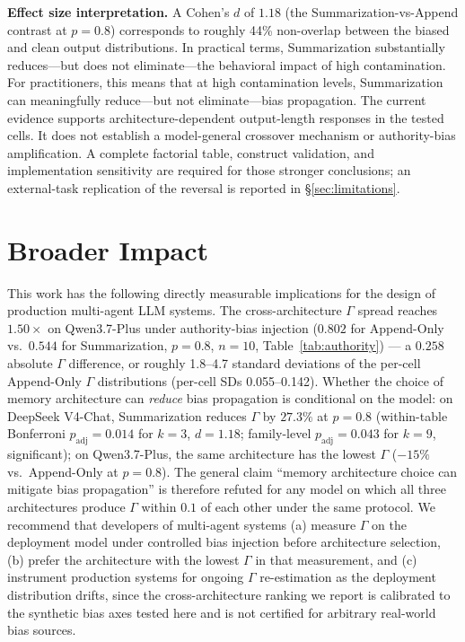 \documentclass[11pt]{article}
\begin{document}
\textbf{Effect size interpretation.} A Cohen's $d$ of $1.18$ (the Summarization-vs-Append contrast at $p{=}0.8$) corresponds to roughly 44\% non-overlap between the biased and clean output distributions. In practical terms, Summarization substantially reduces---but does not eliminate---the behavioral impact of high contamination. For practitioners, this means that at high contamination levels, Summarization can meaningfully reduce---but not eliminate---bias propagation.
The current evidence supports architecture-dependent output-length responses in the tested cells. It does not establish a model-general crossover mechanism or authority-bias amplification. A complete factorial table, construct validation, and implementation sensitivity are required for those stronger conclusions; an external-task replication of the reversal is reported in \S\ref{sec:limitations}.


\section{Broader Impact}

This work has the following directly measurable implications for the design of production multi-agent LLM systems. The cross-architecture $\Gamma$ spread reaches $1.50\times$ on Qwen3.7-Plus under authority-bias injection ($0.802$ for Append-Only vs.\ $0.544$ for Summarization, $p=0.8$, $n{=}10$, Table~\ref{tab:authority}) --- a $0.258$ absolute $\Gamma$ difference, or roughly 1.8--4.7 standard deviations of the per-cell Append-Only $\Gamma$ distributions (per-cell SDs 0.055--0.142). Whether the choice of memory architecture can \emph{reduce} bias propagation is conditional on the model: on DeepSeek V4-Chat, Summarization reduces $\Gamma$ by $27.3\%$ at $p=0.8$ (within-table Bonferroni $p_{\text{adj}}=0.014$ for $k=3$, $d=1.18$; family-level $p_{\text{adj}}=0.043$ for $k=9$, significant); on Qwen3.7-Plus, the same architecture has the lowest $\Gamma$ ($-15\%$ vs.\ Append-Only at $p{=}0.8$). The general claim ``memory architecture choice can mitigate bias propagation'' is therefore refuted for any model on which all three architectures produce $\Gamma$ within $0.1$ of each other under the same protocol. We recommend that developers of multi-agent systems (a) measure $\Gamma$ on the deployment model under controlled bias injection before architecture selection, (b) prefer the architecture with the lowest $\Gamma$ in that measurement, and (c) instrument production systems for ongoing $\Gamma$ re-estimation as the deployment distribution drifts, since the cross-architecture ranking we report is calibrated to the synthetic bias axes tested here and is not certified for arbitrary real-world bias sources.
\end{document}
